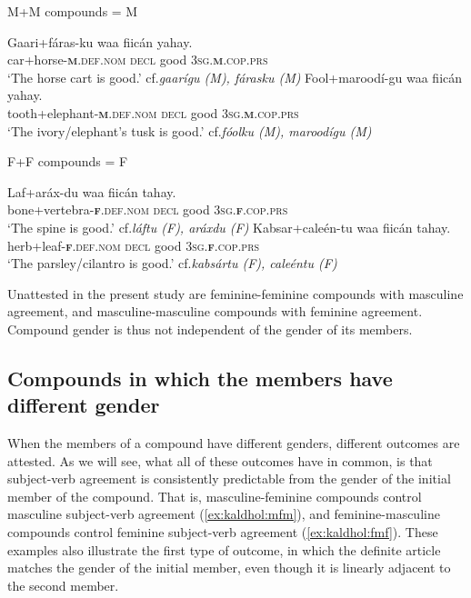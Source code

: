 \documentclass[output=paper]{langscibook}
\begin{document}
\ea\label{ex:kaldhol:mm}
	M+M compounds = M
	\begin{xlist}
		\ex\label{ex:kaldhol:gaarifaras}
		\gll Gaari+fáras-ku waa fiicán yahay.\\
		car+horse-\textsc{\textbf{m}.def.nom} \textsc{decl} good \textsc{3sg.\textbf{m}}.\textsc{cop.prs}\\
		\glt `The horse cart is good.' \hfill cf.\@ \textit{gaarígu (M), fárasku (M)}
		\ex\label{ex:kaldhol:foolmaroodi}
		\gll Fool+maroodí-gu waa fiicán yahay.\\
		tooth+elephant-\textsc{\textbf{m}.def.nom} \textsc{decl} good \textsc{3sg.\textbf{m}}.\textsc{cop.prs}\\
		\glt `The ivory/elephant's tusk is good.' \hfill cf.\@ \textit{fóolku (M), maroodígu (M)}
	\end{xlist}
\ex\label{ex:kaldhol:ff}
	F+F compounds = F
	\begin{xlist}
		\ex
		\gll Laf+aráx-du waa fiicán tahay.\\
		bone+vertebra-\textsc{\textbf{f}.def.nom} \textsc{decl} good \textsc{3sg.\textbf{f}}.\textsc{cop.prs}\\
		\glt `The spine is good.' \hfill cf.\@ \textit{láftu (F), aráxdu (F)}
		\ex
		\gll Kabsar+caleén-tu waa fiicán tahay.\\
		herb+leaf-\textsc{\textbf{f}.def.nom} \textsc{decl} good \textsc{3sg.\textbf{f}}.\textsc{cop.prs}\\
		\glt `The parsley/cilantro is good.' \hfill cf.\@ \textit{kabsártu (F), caleéntu (F)}
	\end{xlist}
\z
Unattested in the present study are feminine-feminine compounds with masculine agreement, and masculine-masculine compounds with feminine agreement. Compound gender is thus not independent of the gender of its members. 

\subsection{Compounds in which the members have different gender}\label{sec:kaldhol:different}

When the members of a compound have different genders, different outcomes are attested. As we will see, what all of these outcomes have in common, is that subject-verb agreement is consistently predictable from the gender of the initial member of the compound. That is, masculine-feminine compounds control masculine subject-verb agreement (\ref{ex:kaldhol:mfm}), and feminine-masculine compounds control feminine subject-verb agreement (\ref{ex:kaldhol:fmf}). These examples also illustrate the first type of outcome, in which the definite article matches the gender of the initial member, even though it is linearly adjacent to the second member.
\end{document}
